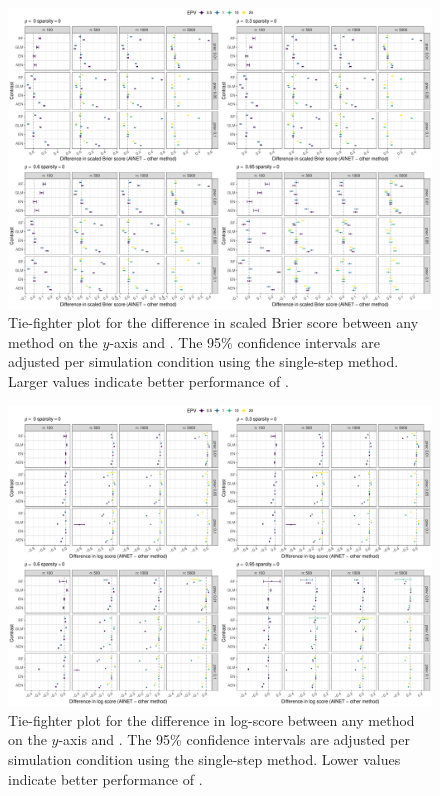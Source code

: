 \documentclass[a4paper, 11pt]{article}
\begin{document}
\begin{landscape}
\begin{figure}[!ht]
\center
\includegraphics[width=0.8\linewidth]{figureS2.pdf}
\caption{Tie-fighter plot for the difference in scaled Brier score between any
  method on the $y$-axis and \ainet{}. The 95\% confidence intervals are adjusted
  per simulation condition using the single-step method. Larger
  values indicate better performance of \ainet{}. } \label{fig:tiesbrier}
\end{figure}
\end{landscape}

\begin{landscape}
\begin{figure}[!ht]
\center
\includegraphics[width=0.8\linewidth]{figureS3.pdf}
\caption{Tie-fighter plot for the difference in log-score between any method on
  the $y$-axis and \ainet{}. The 95\% confidence intervals are adjusted per
  simulation condition using the single-step method. Lower values indicate
  better performance of \ainet{}. } \label{fig:tienll}
\end{figure}
\end{landscape}
\end{document}
